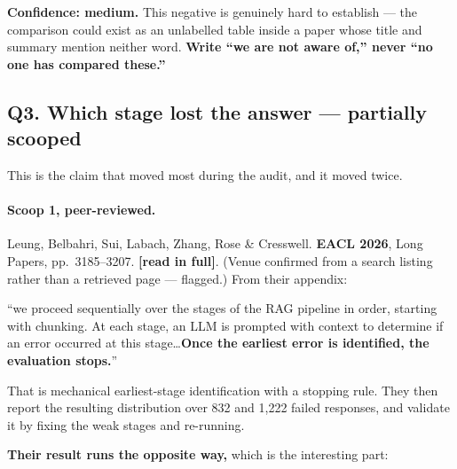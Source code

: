 \documentclass[11pt,a4paper]{article}
\newcommand{\vpartial}{\textcolor{partial}{\textbf{partially scooped}}}
\newcommand{\readtag}{\textcolor{standing}{\textbf{[read in full]}}}
\begin{document}
\textbf{Confidence: medium.} This negative is genuinely hard to establish --- the
comparison could exist as an unlabelled table inside a paper whose title and
summary mention neither word. \textbf{Write ``we are not aware of,'' never ``no one
has compared these.''}

\subsection{Q3. Which stage lost the answer --- \texorpdfstring{\vpartial}{partially scooped}}

This is the claim that moved most during the audit, and it moved twice.

\paragraph{Scoop 1, peer-reviewed.} Leung, Belbahri, Sui, Labach, Zhang, Rose \&
Cresswell. \textbf{EACL 2026}, Long Papers, pp.~3185--3207. \readtag. (Venue
confirmed from a search listing rather than a retrieved page --- flagged.) From
their appendix:

\begin{quotebox}
``we proceed sequentially over the stages of the RAG pipeline in order, starting
with chunking. At each stage, an LLM is prompted with context to determine if an
error occurred at this stage\ldots \textbf{Once the earliest error is identified,
the evaluation stops.}''
\end{quotebox}

That is mechanical earliest-stage identification with a stopping rule. They then
report the resulting distribution over 832 and 1{,}222 failed responses, and
validate it by fixing the weak stages and re-running.

\textbf{Their result runs the opposite way,} which is the interesting part:
\end{document}
